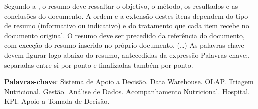 \setlength{\absparsep}{18pt} %
\begin{resumo}
 
Segundo a , o resumo deve ressaltar o objetivo, o método, os resultados e as conclusões do documento. A ordem e a extensão destes itens dependem do tipo de resumo (informativo ou indicativo) e do tratamento que cada item recebe no documento original. O resumo deve ser precedido da referência do documento, com exceção do resumo inserido no próprio documento. (\ldots) As palavras-chave devem figurar logo abaixo do resumo, antecedidas da expressão Palavras-chave:, separadas entre si por ponto e finalizadas também por ponto.

 \textbf{Palavras-chave}: Sistema de Apoio a Decisão. Data Warehouse. OLAP. Triagem Nutricional. Gestão. Análise de Dados. Acompanhamento Nutricional. Hospital. KPI. Apoio a Tomada de Decisão. 
\end{resumo}